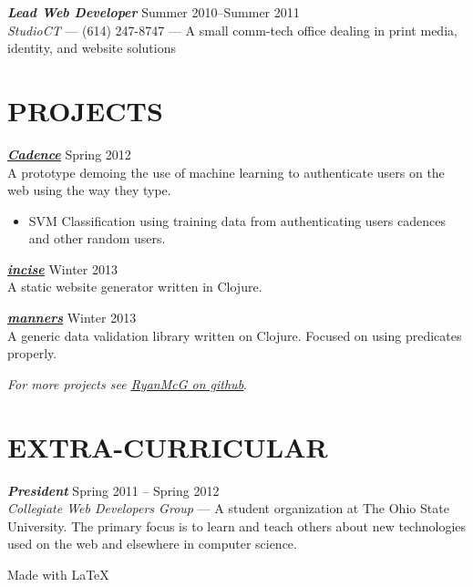\documentclass[line,letterpaper]{resume}
\begin{document}
\begin{resume}
    {\sl\textbf{Lead Web Developer}} \hfill Summer 2010--Summer 2011\\
    \emph{StudioCT} --- (614) 247-8747 --- A small comm-tech office dealing
    in print media, identity, and website solutions
    \vspace{-6pt}


    \section{\uppercase{Projects}}
    {\sl\textbf{\underline{\href{https://github.com/RyanMcG/Cadence}{Cadence}}}}
    \hfill Spring 2012\\
    A prototype demoing the use of machine learning to authenticate users on the
    web using the way they type.
    \begin{itemize}
        \item SVM Classification using training data from authenticating users
            cadences and other random users.
    \end{itemize}

    \vspace{-6pt}
    {\sl\textbf{\underline{\href{https://github.com/RyanMcG/incise}{incise}}}}
    \hfill Winter 2013\\
    A static website generator written in Clojure.
    \vspace{-6pt}

    {\sl\textbf{\underline{\href{https://github.com/RyanMcG/manners}{manners}}}}
    \hfill Winter 2013\\
    A generic data validation library written on Clojure.
    Focused on using predicates properly.

    \vspace{-6pt}

    \hfill \emph{For more projects see
    \underline{\href{https://github.com/RyanMcG}{RyanMcG on github}}}.

    \vspace{-15pt}

    \section{\uppercase{Extra-Curricular}}
    {\sl\textbf{President}} \hfill Spring 2011 -- Spring 2012\\
    \emph{Collegiate Web Developers Group} --- A student organization at The
    Ohio State University. The primary focus is to learn and teach others about
    new technologies used on the web and elsewhere in computer science.

\end{resume}

\vspace{30pt}

\hfill Made with \LaTeX{}
\end{document}
